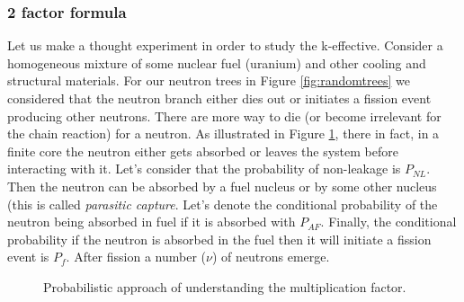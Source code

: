 \subsubsection*{2 factor formula}

Let us make a thought experiment in order to study the k-effective. Consider a homogeneous mixture of some nuclear fuel (uranium) and other cooling and structural materials. For our neutron trees in Figure \ref{fig:randomtrees} we considered that the neutron branch either dies out or initiates a fission event producing other neutrons. There are more way to die (or become irrelevant for the chain reaction) for a neutron. As illustrated in Figure \ref{fig:2factors}, there in fact, in a finite core the neutron either gets absorbed or leaves the system before interacting with it. Let's consider that the probability of non-leakage is $P_{NL}$. Then the neutron can be absorbed by a fuel nucleus or by some other nucleus (this is called \textit{parasitic capture}. Let's denote the conditional probability of the neutron being absorbed in fuel if it is absorbed with $P_{AF}$. Finally, the conditional probability if the neutron is absorbed in the fuel then it will initiate a fission event is $P_f$. After fission a number ($\nu$) of neutrons emerge.

\begin{figure}[ht!]
\protect {}\protect
\caption{\label{fig:2factors} \footnotesize{Probabilistic approach of understanding the multiplication factor.}}
\end{figure}

